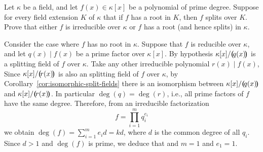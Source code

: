 \begin{solution}
\end{solution}

\begin{probl}
    Let\/ $\kappa$ be a field, and let\/ $f(x) \in \kappa[x]$ be a polynomial of prime degree. Suppose for every field extension\/ $K$ of\/ $\kappa$ that if\/ $f$ has a root in\/ $K$, then\/ $f$ splits over\/ $K$. Prove that either\/ $f$ is irreducible over\/ $\kappa$ or\/ $f$ has a root (and hence splits) in\/ $\kappa$.
\end{probl}

\begin{solution}
    Consider the case where $f$ has no root in $\kappa$. Suppose that $f$ is reducible over $\kappa$, and let $q(x)\mid f(x)$ be a prime factor over $\kappa[x]$. By hypothesis $\kappa[x]/\textrm{\boldmath$($}\!q(x)\!\textrm{\boldmath$)$}$ is a splitting field of $f$ over $\kappa$. Take any other irreducible polynomial $r(x)\mid f(x)$, Since $\kappa[x]/\textrm{\boldmath$($}\!r(x)\!\textrm{\boldmath$)$}$ is also an splitting field of $f$ over $\kappa$, by Corollary~\ref{cor:isomorphic-split-fields} there is an isomorphism between $\kappa[x]/\textrm{\boldmath$($}\!q(x)\!\textrm{\boldmath$)$}$ and $\kappa[x]/\textrm{\boldmath$($}\!r(x)\!\textrm{\boldmath$)$}$. In particular $\deg(q)=\deg(r)$, i.e., all prime factors of $f$ have the same degree. Therefore, from an irreducible factorization
    $$
        f =\prod_{i=1}^mq_i^{e_i}
    $$
    we obtain $\deg(f)=\sum_{i=1}^me_id=kd$, where $d$ is the common degree of all $q_i$. Since $d>1$ and $\deg(f)$ is prime, we deduce that and $m=1$ and $e_1=1$.
    
\end{solution}

